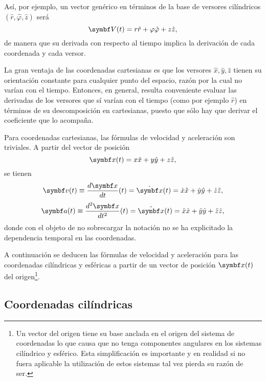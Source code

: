 \documentclass[10pt,oneside]{CBFT_book}
\begin{document}
Así, por ejemplo, un vector genérico en términos de la base de versores cilíndricos $(\hat{r},\hat{\varphi},\hat{z})$ será
\[
	\vb{V}(t) = r \hat{r} + \varphi \hat{\varphi} + z \hat{z},
\]
de manera que su derivada con respecto al tiempo implica la derivación de cada coordenada y cada versor.

La gran ventaja de las coordenadas cartesianas es que los versores $ \hat{ x }, \hat{ y }, \hat{ z }$ tienen su orientación
constante para cualquier punto del espacio, razón por la cual no varían con el tiempo. Entonces, en general, resulta 
conveniente evaluar las derivadas de los versores que sí varían con el tiempo (como por ejemplo $\hat{r}$) en términos de
su descomposición en cartesianas, puesto que sólo hay que derivar el coeficiente que lo acompaña.

Para coordenadas cartesianas, las fórmulas de velocidad y aceleración son triviales. A partir del vector de posición
\[
	\vb{x}(t) = x \hat{x} + y \hat{y}  + z\hat{z},
\]
se tienen 
\[
	\vb{v}(t) \equiv \dtot{\vb{x}}{t}(t) = \dot{\vb{x}}(t) = \dot{x} \hat{x} + \dot{y} \hat{y}  + \dot{z}\hat{z},
\]
\[
	\vb{a}(t) \equiv \dtot[2]{\vb{x}}{t}(t) = \ddot{\vb{x}}(t) = \ddot{x} \hat{x} + \ddot{y} \hat{y}  + \ddot{z} \hat{z},
\]
donde con el objeto de no sobrecargar la notación no se ha explicitado la dependencia temporal en las coordenadas.

A continuación se deducen las fórmulas de velocidad y aceleración para las coordenadas cilíndricas y esféricas a partir de
un vector de posición $ \vb{x}(t) $ del origen\footnote{Un vector del origen tiene su base anclada en el origen del sistema
de coordenadas lo que causa que no tenga componentes angulares en los sistemas cilíndrico y esférico. Esta simplificación
es importante y en realidad si no fuera aplicable la utilización de estos sistemas tal vez pierda su razón de ser.}.


\subsection{Coordenadas cilíndricas}
\end{document}
